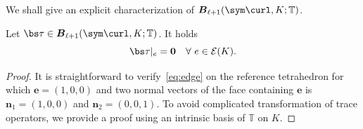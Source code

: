We shall give an explicit characterization of $\boldsymbol B_{\ell+1}(\sym\curl, K;\mathbb T)$. 
\begin{lemma}\label{lem:symcurlbubbleedgevanish}
Let $\bs\tau\in \boldsymbol B_{\ell+1}(\sym\curl, K;\mathbb T)$. It holds
\begin{equation}\label{eq:edge}
\bs\tau|_e=\boldsymbol 0\quad\forall~e\in\mathcal E(K).
\end{equation}
\end{lemma}
\begin{proof}
It is straightforward to verify~\eqref{eq:edge} on the reference tetrahedron for which $\boldsymbol e = (1,0,0)$ and two normal vectors of the face containing $\boldsymbol e$ is $\boldsymbol n_1= (1,0,0)$ and $\boldsymbol n_2=(0,0,1)$. To avoid complicated transformation of trace operators, we provide a proof using an intrinsic basis of $\mathbb T$ on $K$. 


\end{proof}
